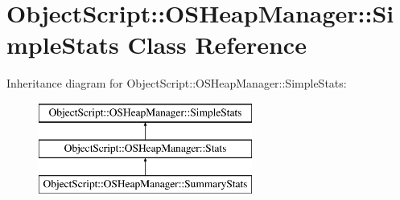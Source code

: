 \hypertarget{class_object_script_1_1_o_s_heap_manager_1_1_simple_stats}{}\section{Object\+Script\+:\+:O\+S\+Heap\+Manager\+:\+:Simple\+Stats Class Reference}
\label{class_object_script_1_1_o_s_heap_manager_1_1_simple_stats}
Inheritance diagram for Object\+Script\+:\+:O\+S\+Heap\+Manager\+:\+:Simple\+Stats\+:\begin{figure}[H]
\begin{center}
\leavevmode
\includegraphics[height=3.000000cm]{class_object_script_1_1_o_s_heap_manager_1_1_simple_stats}
\end{center}
\end{figure}
